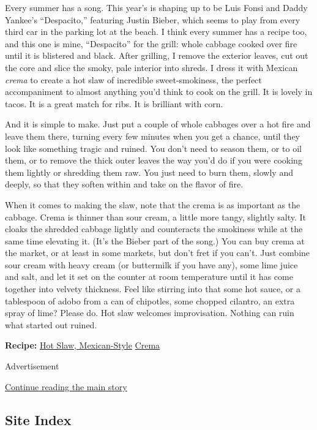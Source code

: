 Every summer has a song. This year's is shaping up to be Luis Fonsi and
Daddy Yankee's ``Despacito,'' featuring Justin Bieber, which seems to
play from every third car in the parking lot at the beach. I think every
summer has a recipe too, and this one is mine, ``Despacito'' for the
grill: whole cabbage cooked over fire until it is blistered and black.
After grilling, I remove the exterior leaves, cut out the core and slice
the smoky, pale interior into shreds. I dress it with Mexican
\emph{crema} to create a hot slaw of incredible sweet-smokiness, the
perfect accompaniment to almost anything you'd think to cook on the
grill. It is lovely in tacos. It is a great match for ribs. It is
brilliant with corn.

And it is simple to make. Just put a couple of whole cabbages over a hot
fire and leave them there, turning every few minutes when you get a
chance, until they look like something tragic and ruined. You don't need
to season them, or to oil them, or to remove the thick outer leaves the
way you'd do if you were cooking them lightly or shredding them raw. You
just need to burn them, slowly and deeply, so that they soften within
and take on the flavor of fire.

When it comes to making the slaw, note that the crema is as important as
the cabbage. Crema is thinner than sour cream, a little more tangy,
slightly salty. It cloaks the shredded cabbage lightly and counteracts
the smokiness while at the same time elevating it. (It's the Bieber part
of the song.) You can buy crema at the market, or at least in some
markets, but don't fret if you can't. Just combine sour cream with heavy
cream (or buttermilk if you have any), some lime juice and salt, and let
it set on the counter at room temperature until it has come together
into velvety thickness. Feel like stirring into that some hot sauce, or
a tablespoon of adobo from a can of chipotles, some chopped cilantro, an
extra spray of lime? Please do. Hot slaw welcomes improvisation. Nothing
can ruin what started out ruined.

\textbf{Recipe:}
\href{https://cooking.nytimes3xbfgragh.onion/recipes/1018884-hot-slaw-mexican-style}{Hot
Slaw, Mexican-Style} \textbar{}
\href{https://cooking.nytimes3xbfgragh.onion/recipes/1018885-crema}{Crema}

Advertisement

\protect\hyperlink{after-bottom}{Continue reading the main story}

\hypertarget{site-index}{%
\subsection{Site Index}\label{site-index}}

